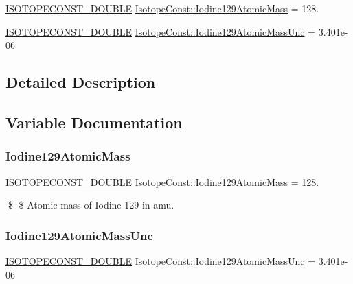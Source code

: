 \begin{DoxyCompactItemize}
\item 
\mbox{\hyperlink{group___isotope_const-_macros_ga8f45a7272ce02c0b4c65c44636ed719a}{I\+S\+O\+T\+O\+P\+E\+C\+O\+N\+S\+T\+\_\+\+D\+O\+U\+B\+LE}} \mbox{\hyperlink{group___isotope_const-_iodine-_i129_ga0f379b780c79699a53c6df7424d1bb93}{Isotope\+Const\+::\+Iodine129\+Atomic\+Mass}} = 128.
\item 
\mbox{\hyperlink{group___isotope_const-_macros_ga8f45a7272ce02c0b4c65c44636ed719a}{I\+S\+O\+T\+O\+P\+E\+C\+O\+N\+S\+T\+\_\+\+D\+O\+U\+B\+LE}} \mbox{\hyperlink{group___isotope_const-_iodine-_i129_gad0a833a543b0047299365bf8c3ea763e}{Isotope\+Const\+::\+Iodine129\+Atomic\+Mass\+Unc}} = 3.\+401e-\/06
\end{DoxyCompactItemize}


\subsection{Detailed Description}


\subsection{Variable Documentation}
\mbox{\label{group___isotope_const-_iodine-_i129_ga0f379b780c79699a53c6df7424d1bb93}} 
\subsubsection{\texorpdfstring{Iodine129\+Atomic\+Mass}{Iodine129AtomicMass}}
{\footnotesize\ttfamily \mbox{\hyperlink{group___isotope_const-_macros_ga8f45a7272ce02c0b4c65c44636ed719a}{I\+S\+O\+T\+O\+P\+E\+C\+O\+N\+S\+T\+\_\+\+D\+O\+U\+B\+LE}} Isotope\+Const\+::\+Iodine129\+Atomic\+Mass = 128.}

\$ \$ Atomic mass of Iodine-\/129 in amu. \mbox{\label{group___isotope_const-_iodine-_i129_gad0a833a543b0047299365bf8c3ea763e}} 
\subsubsection{\texorpdfstring{Iodine129\+Atomic\+Mass\+Unc}{Iodine129AtomicMassUnc}}
{\footnotesize\ttfamily \mbox{\hyperlink{group___isotope_const-_macros_ga8f45a7272ce02c0b4c65c44636ed719a}{I\+S\+O\+T\+O\+P\+E\+C\+O\+N\+S\+T\+\_\+\+D\+O\+U\+B\+LE}} Isotope\+Const\+::\+Iodine129\+Atomic\+Mass\+Unc = 3.\+401e-\/06}

